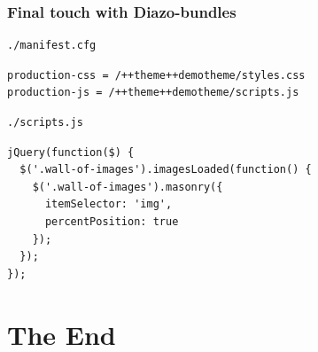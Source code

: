 \documentclass[aspectratio=43]{beamer}
\begin{document}
\begin{frame}
\frametitle{Final touch with Diazo-bundles}
\begin{verbatim}
./manifest.cfg
\end{verbatim}
\begin{verbatim}
production-css = /++theme++demotheme/styles.css
production-js = /++theme++demotheme/scripts.js
\end{verbatim}
\begin{verbatim}
./scripts.js
\end{verbatim}
\begin{verbatim}
jQuery(function($) {
  $('.wall-of-images').imagesLoaded(function() {
    $('.wall-of-images').masonry({
      itemSelector: 'img',
      percentPosition: true
    });
  });
});
\end{verbatim}
\end{frame}

\section{The End}

{
%
\begin{frame}[plain,t]
  \vfill
  \centering
  \Huge
  \bfseries
  \lsstyle
  \par
  \vspace{0.5cm}
  \Large
  \contourlength{1.00pt}
\end{frame}
}
\end{document}
